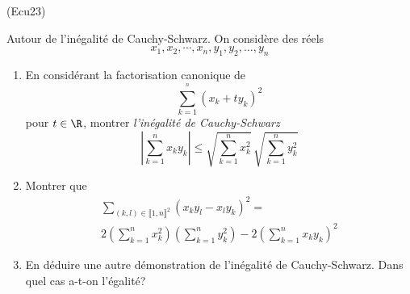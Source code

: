 \begin{tiny}(Ecu23)\end{tiny} \label{Ecu23} Autour de l'inégalité de Cauchy-Schwarz.\newline
On considère des réels
\begin{displaymath}
  x_1,x_2, \cdots, x_n, y_1, y_2, \dots ,y_n
\end{displaymath}
\begin{enumerate}
  \item En considérant la factorisation canonique de 
\begin{displaymath}
 \sum_{k=1}^{^n}(x_k + ty_k)^2
\end{displaymath}
pour $t\in \R$, montrer \emph{l'inégalité de Cauchy-Schwarz}
\begin{displaymath}
 \left|\sum_{k=1}^n x_k y_k \right| \leq \sqrt{\sum_{k=1}^n x_k^2}\, \sqrt{\sum_{k=1}^n y_k^2}
\end{displaymath}

  \item Montrer que 
\begin{multline*}
  \sum_{(k,l)\in\llbracket 1,n \rrbracket^2}(x_ky_l -x_ly_k)^2 = \\
  2 \left( \sum_{k=1}^n x_k^2\right) \left( \sum_{k=1}^n y_k^2\right) 
  - 2 \left( \sum_{k=1}^n x_k y_k\right)^2
\end{multline*}
  \item En déduire une autre démonstration de l'inégalité de Cauchy-Schwarz. Dans quel cas a-t-on l'égalité?

\end{enumerate}
